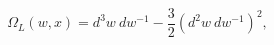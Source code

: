 \begin{equation}
\Omega_{L}(w,x) = d^{3}w~dw^{-1} -\frac{3}{2} (d^{2}w~dw^{-1})^{2},
\end{equation}

